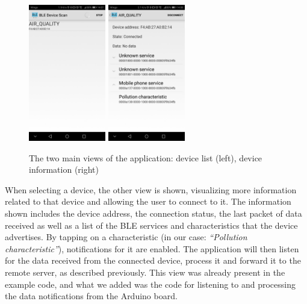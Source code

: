 \documentclass[12pt]{article}
\begin{document}
  \begin{figure}[H]
    \centering
    \includegraphics[width=0.3\textwidth]{images/android1.jpg}
    \includegraphics[width=0.3\textwidth]{images/android2.jpg}
    \caption{The two main views of the application: device list (left), device information (right)}
    \label{fig:app-scan-list}
  \end{figure}

  When selecting a device, the other view is shown, visualizing more information related to that device and allowing the user to connect to it. The information shown includes the device address, the connection status, the last packet of data received as well as a list of the BLE services and characteristics that the device advertises. By tapping on a characteristic (in our case: \textit{``Pollution characteristic''}), notifications for it are enabled. The application will then listen for the data received from the connected device, process it and forward it to the remote server, as described previously.
  This view was already present in the example code, and what we added was the code for listening to and processing the data notifications from the Arduino board.
\end{document}
